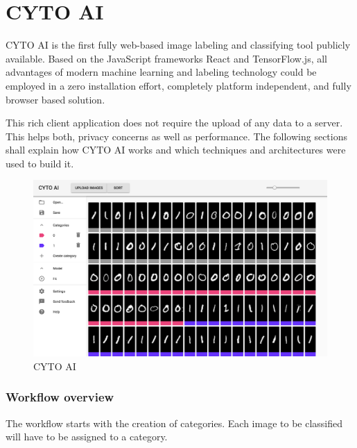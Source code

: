 \chapter{CYTO AI}

CYTO AI is the first fully web-based image labeling and classifying tool publicly available. Based on the JavaScript frameworks React and TensorFlow.js,
all advantages of modern machine learning and labeling
technology could be employed in a zero installation effort,
completely platform independent, and fully browser based
solution.

This rich client application does not require the upload of
any data to a server. This helps both, privacy concerns as well as performance. The following sections shall explain how CYTO AI works and which techniques and architectures were used to build it.

\begin{figure}[H]
	\centering
	\includegraphics[width=0.8\linewidth]{bilder/cyto/cyto.png}
	\caption{CYTO AI}
	\label{fig:COMPONENT}
\end{figure}


\subsection{Workflow overview}

The workflow starts with the creation of categories. Each image to be classified will have to be assigned to a category.

